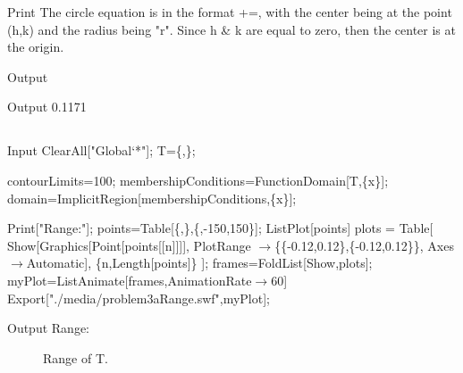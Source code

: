\documentclass[11pt,a4paper]{article}
\begin{document}
\begin{mdframed}
\begin{mmaCell}{Print}
The circle equation is in the format +=, with the
center being at the point (h,k) and the radius being "r". Since
h & k are equal to zero, then the center is at the origin.
\end{mmaCell}
\end{mdframed}

\begin{mdframed}
\begin{mmaCell}{Output}
\end{mmaCell}

\begin{mmaCell}{Output}
0.1171
\end{mmaCell}
\end{mdframed}

\subsection{}
\begin{mmaCell}[moredefined={T, contourLimits, membershipConditions, domain, points, plots, frames, myPlot},morefunctionlocal={n}]{Input}
ClearAll["Global`*"];
T=\{,\};

contourLimits=100;
membershipConditions=FunctionDomain[T,\{x\}];
domain=ImplicitRegion[membershipConditions,\{x\}];

Print["Range:"];
points=Table[\{,\},\{,-150,150\}];
ListPlot[points]
plots = Table[
    Show[Graphics[Point[points[[n]]]],
    PlotRange \(\pmb{\to}\)\{\{-0.12,0.12\},\{-0.12,0.12\}\},
    Axes\(\pmb{\to}\)Automatic],
    \{n,Length[points]\}
];
frames=FoldList[Show,plots];
myPlot=ListAnimate[frames,AnimationRate\(\pmb{\to}\)60]
Export["./media/problem3aRange.swf",myPlot];
\end{mmaCell}

\begin{mmaCell}{Output}
Range:
\end{mmaCell}
\begin{figure}[!h]
\centering
{}
\caption{Range of T.\label{figure_ambush}}
\end{figure}
\end{document}
